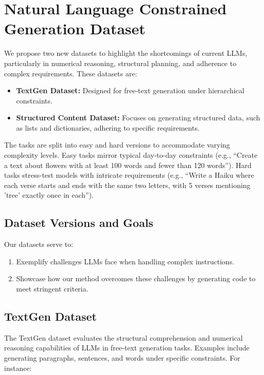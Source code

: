 \documentclass[10pt]{article} %
\begin{document}
    

    \section{Natural Language Constrained Generation Dataset}
    \label{sec:textgen_dataset}
    We propose two new datasets to highlight the shortcomings of current LLMs, particularly in numerical reasoning, structural planning, and adherence to complex requirements. These datasets are:

    \begin{itemize}
        \item \textbf{TextGen Dataset:} Designed for free-text generation under hierarchical constraints.
        \item \textbf{Structured Content Dataset:} Focuses on generating structured data, such as lists and dictionaries, adhering to specific requirements.
    \end{itemize}

    The tasks are split into easy and hard versions to accommodate varying complexity levels. Easy tasks mirror typical day-to-day constraints (e.g., \enquote{Create a text about flowers with at least 100 words and fewer than 120 words}). Hard tasks stress-test models with intricate requirements (e.g., \enquote{Write a Haiku where each verse starts and ends with the same two letters, with 5 verses mentioning 'tree' exactly once in each}).

    \subsection{Dataset Versions and Goals}
    \label{subsec:dataset_versions}
    Our datasets serve to:
    \begin{enumerate}
        \item Exemplify challenges LLMs face when handling complex instructions.
        \item Showcase how our method overcomes these challenges by generating code to meet stringent criteria.
    \end{enumerate}

    \subsection{TextGen Dataset}
    \label{subsec:textgen_dataset}
    The TextGen dataset evaluates the structural comprehension and numerical reasoning capabilities of LLMs in free-text generation tasks. Examples include generating paragraphs, sentences, and words under specific constraints. For instance:
\end{document}

